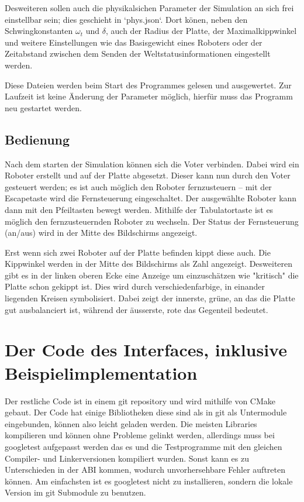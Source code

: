 \documentclass[
    12pt,
    bibliography=totoc,
    ngerman,
    enabledeprecatedfontcommands
]{scrartcl}
\begin{document}
Desweiteren sollen auch die physikalsichen Parameter der Simulation an sich frei einstellbar sein; dies geschieht in `phys.json`. Dort k{\"{o}}nen, neben den Schwingkonstanten
$\omega_t$ und $\delta$, auch der Radius der Platte, der Maximalkippwinkel und weitere Einstellungen wie das Basisgewicht eines Roboters oder der Zeitabstand zwischen dem
Senden der Weltstatusinformationen eingestellt werden.

Diese Dateien werden beim Start des Programmes gelesen und ausgewertet. Zur Laufzeit ist keine {\"{A}}nderung der Parameter m{\"{o}}glich, hierf{\"{u}}r muss das Programm
neu gestartet werden.

\subsection{Bedienung}
Nach dem starten der Simulation k{\"{o}}nnen sich die Voter verbinden. Dabei wird ein Roboter erstellt und auf der Platte abgesetzt. Dieser kann nun durch den Voter
gesteuert werden; es ist auch m{\"{o}}glich den Roboter fernzusteuern -- mit der Escapetaste wird die Fernsteuerung eingeschaltet. Der ausgew{\"{a}}hlte Roboter kann
dann mit den Pfeiltasten bewegt werden. Mithilfe der Tabulatortaste ist es m{\"{o}}glich den fernzusteuernden Roboter zu wechseln. Der Status der Fernsteuerung (an/aus)
wird in der Mitte des Bildschirms angezeigt.

Erst wenn sich zwei Roboter auf der Platte befinden kippt diese auch. Die Kippwinkel werden in der Mitte des Bildschirms als Zahl angezeigt. Desweiteren gibt es in der
linken oberen Ecke eine Anzeige um einzusch{\"{a}}tzen wie "kritisch" die Platte schon gekippt ist. Dies wird durch verschiedenfarbige, in einander liegenden Kreisen
symbolisiert. Dabei zeigt der innerste, gr{\"{u}}ne, an das die Platte gut ausbalanciert ist, w{\"{a}}hrend der {\"{a}}usserste, rote das Gegenteil bedeutet.


\section{Der Code des Interfaces, inklusive Beispielimplementation}
Der restliche Code ist in einem git repository und wird mithilfe von CMake gebaut. Der Code hat einige Bibliotheken
diese sind als in git als Untermodule eingebunden, k{\"{o}}nnen also leicht geladen werden.
Die meisten Libraries kompilieren und k{\"{o}}nnen ohne Probleme gelinkt werden, allerdings muss bei googletest aufgepasst werden das es und die Testprogramme mit den
gleichen Compiler- und Linkerversionen kompiliert wurden. Sonst kann es zu Unterschieden in der ABI kommen, wodurch unvorhersehbare Fehler auftreten k{\"{o}}nnen. Am einfachsten
ist es googletest nicht zu installieren, sondern die lokale Version im git Submodule zu benutzen.
\end{document}
